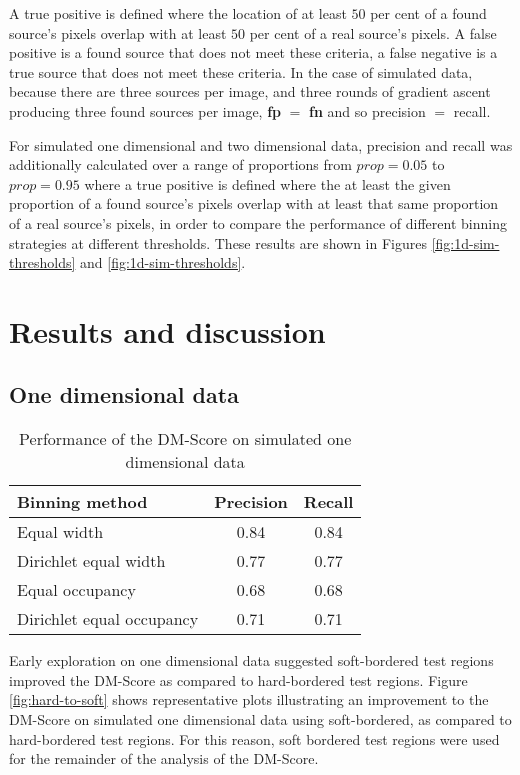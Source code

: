 A true positive is defined where the location of at least $50$ per cent of a found source's pixels overlap with at least $50$ per cent of a real source's pixels. A false positive is a found source that does not meet these criteria, a false negative is a true source that does not meet these criteria. In the case of simulated data, because there are three sources per image, and three rounds of gradient ascent producing three found sources per image, \textbf{fp} $=$ \textbf{fn} and so precision $=$ recall.

For simulated one dimensional and two dimensional data, precision and recall was additionally calculated over a range of proportions from $prop=0.05$ to $prop=0.95$ where a true positive is defined where the at least the given proportion of a found source's pixels overlap with at least that same proportion of a real source's pixels, in order to compare the performance of different binning strategies at different thresholds. These results are shown in Figures \ref{fig:1d-sim-thresholds} and \ref{fig:1d-sim-thresholds}.

\section{Results and discussion}\label{sec:results}

\subsection{One dimensional data}

\begin{table}
\centering
\caption[Performance of the DM-Score (simulated 1D)]{Performance of the DM-Score on simulated one dimensional data}
\begin{tabular}{l c c }
\hline
Binning method  & Precision & Recall \\\hline
Equal width & 0.84 & 0.84  \\
Dirichlet equal width & 0.77 & 0.77 \\
Equal occupancy & 0.68 & 0.68 \\
Dirichlet equal occupancy & 0.71 & 0.71 \\\hline
\end{tabular}
\label{table:1d-sim}
\end{table}

Early exploration on one dimensional data suggested soft-bordered test regions improved the DM-Score as compared to hard-bordered test regions. Figure \ref{fig:hard-to-soft} shows representative plots illustrating an improvement to the DM-Score on simulated one dimensional data using soft-bordered, as compared to hard-bordered test regions. For this reason, soft bordered test regions were used for the remainder of the analysis of the DM-Score.

